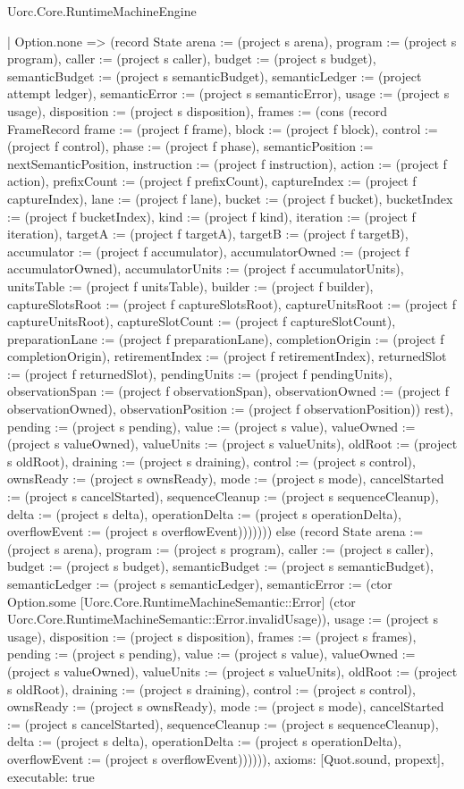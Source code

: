 \begin{lexlean}{Uorc.Core.RuntimeMachineEngine}
\begin{semanticmodule}
{              | Option.none => (record State {arena := (project s arena), program := (project s program), caller := (project s caller), budget := (project s budget), semanticBudget := (project s semanticBudget), semanticLedger := (project attempt ledger), semanticError := (project s semanticError), usage := (project s usage), disposition := (project s disposition), frames := (cons (record FrameRecord {frame := (project f frame), block := (project f block), control := (project f control), phase := (project f phase), semanticPosition := nextSemanticPosition, instruction := (project f instruction), action := (project f action), prefixCount := (project f prefixCount), captureIndex := (project f captureIndex), lane := (project f lane), bucket := (project f bucket), bucketIndex := (project f bucketIndex), kind := (project f kind), iteration := (project f iteration), targetA := (project f targetA), targetB := (project f targetB), accumulator := (project f accumulator), accumulatorOwned := (project f accumulatorOwned), accumulatorUnits := (project f accumulatorUnits), unitsTable := (project f unitsTable), builder := (project f builder), captureSlotsRoot := (project f captureSlotsRoot), captureUnitsRoot := (project f captureUnitsRoot), captureSlotCount := (project f captureSlotCount), preparationLane := (project f preparationLane), completionOrigin := (project f completionOrigin), retirementIndex := (project f retirementIndex), returnedSlot := (project f returnedSlot), pendingUnits := (project f pendingUnits), observationSpan := (project f observationSpan), observationOwned := (project f observationOwned), observationPosition := (project f observationPosition)}) rest), pending := (project s pending), value := (project s value), valueOwned := (project s valueOwned), valueUnits := (project s valueUnits), oldRoot := (project s oldRoot), draining := (project s draining), control := (project s control), ownsReady := (project s ownsReady), mode := (project s mode), cancelStarted := (project s cancelStarted), sequenceCleanup := (project s sequenceCleanup), delta := (project s delta), operationDelta := (project s operationDelta), overflowEvent := (project s overflowEvent)})))))) else (record State {arena := (project s arena), program := (project s program), caller := (project s caller), budget := (project s budget), semanticBudget := (project s semanticBudget), semanticLedger := (project s semanticLedger), semanticError := (ctor Option.some [Uorc.Core.RuntimeMachineSemantic::Error] (ctor Uorc.Core.RuntimeMachineSemantic::Error.invalidUsage)), usage := (project s usage), disposition := (project s disposition), frames := (project s frames), pending := (project s pending), value := (project s value), valueOwned := (project s valueOwned), valueUnits := (project s valueUnits), oldRoot := (project s oldRoot), draining := (project s draining), control := (project s control), ownsReady := (project s ownsReady), mode := (project s mode), cancelStarted := (project s cancelStarted), sequenceCleanup := (project s sequenceCleanup), delta := (project s delta), operationDelta := (project s operationDelta), overflowEvent := (project s overflowEvent)}))))),
  axioms: [Quot.sound, propext],
  executable: true
}


\end{semanticmodule}
\end{lexlean}
